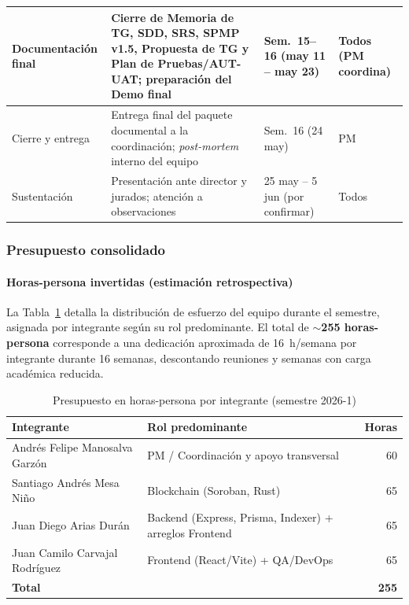 \documentclass[12pt,oneside]{report}
\begin{document}
\begin{longtable}{@{}p{3.0cm} p{5.2cm} p{2.8cm} p{3.2cm}@{}}
        \midrule
        Documentación final & Cierre de Memoria de TG, SDD, SRS, SPMP v1.5, Propuesta de TG y Plan de Pruebas/AUT-UAT; preparación del Demo final & Sem.~15--16 (may 11 -- may 23) & Todos (PM coordina)\\
        \midrule
        Cierre y entrega & Entrega final del paquete documental a la coordinación; \textit{post-mortem} interno del equipo & Sem.~16 (24 may) & PM\\
        \midrule
        Sustentación & Presentación ante director y jurados; atención a observaciones & 25 may -- 5 jun (por confirmar) & Todos\\
      \end{longtable}

      \subsubsection{Presupuesto consolidado}

      \paragraph{Horas-persona invertidas (estimación retrospectiva)}
      La Tabla~\ref{tab:horas-persona} detalla la distribución de esfuerzo del equipo durante el semestre, asignada por integrante según su rol predominante. El total de \textbf{$\sim$255 horas-persona} corresponde a una dedicación aproximada de 16~h/semana por integrante durante 16 semanas, descontando reuniones y semanas con carga académica reducida.

      \begin{table}[H]
        \centering
        \begin{tabular}{@{}p{6.5cm} p{4.8cm} r@{}}
          \toprule
          \textbf{Integrante} & \textbf{Rol predominante} & \textbf{Horas}\\
          \midrule
          Andrés Felipe Manosalva Garzón & PM / Coordinación y apoyo transversal & 60\\
          Santiago Andrés Mesa Niño & Blockchain (Soroban, Rust) & 65\\
          Juan Diego Arias Durán & Backend (Express, Prisma, Indexer) + arreglos Frontend & 65\\
          Juan Camilo Carvajal Rodríguez & Frontend (React/Vite) + QA/DevOps & 65\\
          \midrule
          \textbf{Total} & & \textbf{255}\\
          \bottomrule
        \end{tabular}
        \caption{Presupuesto en horas-persona por integrante (semestre 2026-1)}
        \label{tab:horas-persona}
      \end{table}
\end{document}
